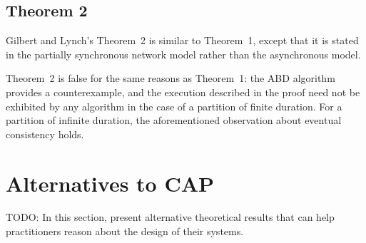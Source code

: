 \documentclass[a4paper,twocolumn,10pt]{article}
\begin{document}
\subsection{Theorem 2}\label{sec:theorem2}

Gilbert and Lynch's Theorem~2 is similar to Theorem~1, except that it is stated in the partially
synchronous network model rather than the asynchronous model.

Theorem~2 is false for the same reasons as Theorem~1: the ABD algorithm provides a counterexample,
and the execution described in the proof need not be exhibited by any algorithm in the case of a
partition of finite duration. For a partition of infinite duration, the aforementioned observation
about eventual consistency holds.

%
%
%

\section{Alternatives to CAP}\label{sec:alternatives}

TODO: In this section, present alternative theoretical results that can help practitioners reason
about the design of their systems.

\end{document}
